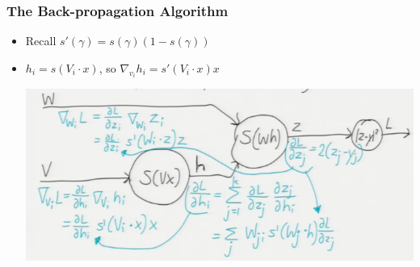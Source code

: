 \documentclass[10pt]{article}
\begin{document}
\subsubsection*{The Back-propagation Algorithm}
\begin{itemize}
	\item Recall $s'(\gamma) = s(\gamma)(1-s(\gamma))$
	\item $h_{i} = s(V_{i} \cdot x)$, so $\nabla_{v_{i}} h_{i} = s'(V_{i}\cdot x)x$
		\begin{center}
			\includegraphics[scale=0.5]{../images/neurals.png}
		\end{center}
\end{itemize}
\end{document}
